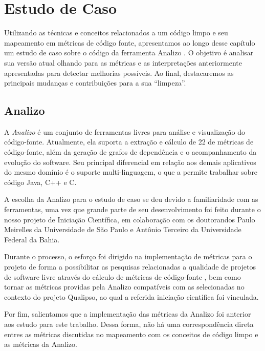 \chapter{Estudo de Caso}
\label{chap:estudodecaso}


Utilizando as técnicas e conceitos relacionados a um código limpo e seu mapeamento 
em métricas de código fonte, apresentamos ao longo desse capítulo um estudo de caso
sobre o código da ferramenta Analizo \citep{analizo2010}. O objetivo é analisar sua versão atual
olhando para as métricas e as interpretações anteriormente apresentadas para detectar
melhorias possíveis. Ao final, destacaremos as principais mudanças e contribuições para
a sua ``limpeza''.


\section{Analizo}

A \textit{Analizo} \citep{analizo2010} é um conjunto de ferramentas livres para análise e visualização
do código-fonte. Atualmente, ela suporta a extração e cálculo de 22 de métricas
de código-fonte, além da geração de grafos de dependência e o acompanhamento da evolução do software.
Seu principal diferencial em relação aos demais aplicativos do mesmo domínio é o suporte multi-linguagem,
o que a permite trabalhar sobre código Java, C++ e C.

A escolha da Analizo para o estudo de caso se deu devido a familiaridade com as ferramentas, 
uma vez que grande parte de seu desenvolvimento foi feito durante o nosso projeto de Iniciação
Científica, em colaboração com os doutorandos Paulo Meirelles da Universidade de São Paulo
e Antônio Terceiro da Universidade Federal da Bahia.

Durante o processo, o esforço foi dirigido na implementação de métricas para o projeto
de forma a possibilitar as pesquisas relacionadas a qualidade de 
projetos de software livre através do cálculo de métricas de código-fonte
\citep{meirelles:sbqs09, carlos_morais_2009, meirelles2010, terceiro_rios_chavez_2010}, bem como tornar as 
métricas providas pela Analizo compatíveis com as selecionadas
no contexto do projeto Qualipso, ao qual a referida iniciação científica foi vinculada.

Por fim, salientamos que a implementação das métricas da Analizo foi anterior aos estudo
para este trabalho. Dessa forma, não há uma correspondência direta entres as métricas
discutidas no mapeamento com os conceitos de código limpo e as métricas da Analizo.

